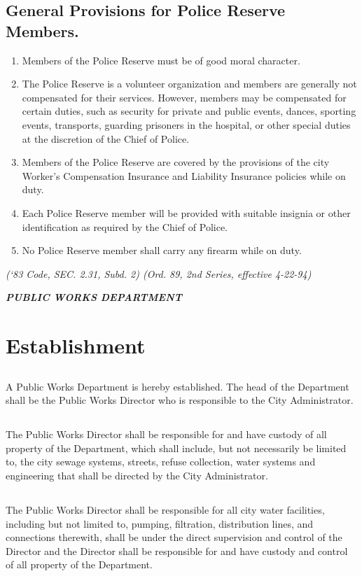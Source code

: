 \subsection{General Provisions for Police Reserve Members.}
\begin{enumerate}
    \item Members of the Police Reserve must be of good moral character.
    \item The Police Reserve is a volunteer organization and members are generally not compensated for their services. However, members may be compensated for certain duties, such as security for private and public events, dances, sporting events, transports, guarding prisoners in the hospital, or other special duties at the discretion of the Chief of Police.
    \item Members of the Police Reserve are covered by the provisions of the city Worker’s Compensation Insurance and Liability Insurance policies while on duty.
    \item Each Police Reserve member will be provided with suitable insignia or other identification as required by the Chief of Police.
    \item No Police Reserve member shall carry any firearm while on duty.
\end{enumerate}
\emph{(‘83 Code, SEC. 2.31, Subd. 2)  (Ord. 89, 2nd Series, effective 4-22-94)}


\centerline{\textbf{\emph{\LARGE{PUBLIC WORKS DEPARTMENT}}}}
\setcounter{section}{79}
\section{Establishment}
\subsection{}
A Public Works Department is hereby established.  The head of the Department shall be the Public Works Director who is responsible to the City Administrator.
\subsection{}
The Public Works Director shall be responsible for and have custody of all property of the Department, which shall include, but not necessarily be limited to, the city sewage systems, streets, refuse collection, water systems and engineering that shall be directed by the City Administrator.
\subsection{}
The Public Works Director shall be responsible for all city water facilities, including but not limited to, pumping, filtration, distribution lines, and connections therewith, shall be under the direct supervision and control of the Director and the Director shall be responsible for and have custody and control of all property of the Department.
